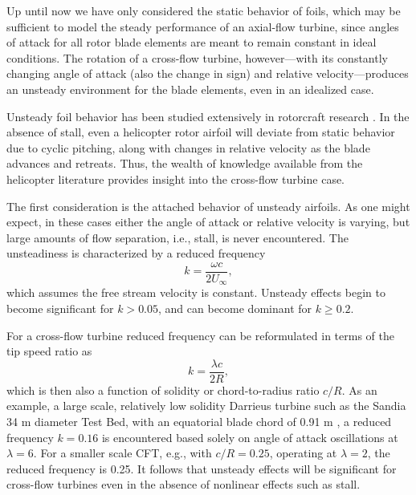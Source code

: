 Up until now we have only considered the static behavior of foils, which may be
sufficient to model the steady performance of an axial-flow turbine, since
angles of attack for all rotor blade elements are meant to remain constant in
ideal conditions. The rotation of a cross-flow turbine, however---with its
constantly changing angle of attack (also the change in sign) and relative
velocity---produces an unsteady environment for the blade elements, even in an
idealized case.

Unsteady foil behavior has been studied extensively in rotorcraft research
\cite{Leishman2006}. In the absence of stall, even a helicopter rotor airfoil
will deviate from static behavior due to cyclic pitching, along with changes in
relative velocity as the blade advances and retreats. Thus, the wealth of
knowledge available from the helicopter literature provides insight into the
cross-flow turbine case.

The first consideration is the attached behavior of unsteady airfoils. As one
might expect, in these cases either the angle of attack or relative velocity is
varying, but large amounts of flow separation, i.e., stall, is never
encountered. The unsteadiness is characterized by a reduced
frequency~\cite{Leishman2006}
\begin{equation}
    k = \frac{\omega c}{2 U_\infty},
\end{equation}
which assumes the free stream velocity is constant. Unsteady effects begin to
become significant for $k > 0.05$, and can become dominant for $k \ge 0.2$.

For a cross-flow turbine reduced frequency can be reformulated in terms of the
tip speed ratio as
\begin{equation}
    k = \frac{\lambda c}{2R},
\end{equation}
which is then also a function of solidity or chord-to-radius ratio $c/R$. As an
example, a large scale, relatively low solidity Darrieus turbine such as the
Sandia 34 m diameter Test Bed, with an equatorial blade chord of 0.91 m
\cite{Murray2011}, a reduced frequency $k=0.16$ is encountered based solely on
angle of attack oscillations at $\lambda=6$. For a smaller scale CFT, e.g., with
$c/R = 0.25$, operating at $\lambda = 2$, the reduced frequency is 0.25. It
follows that unsteady effects will be significant for cross-flow turbines even
in the absence of nonlinear effects such as stall.

